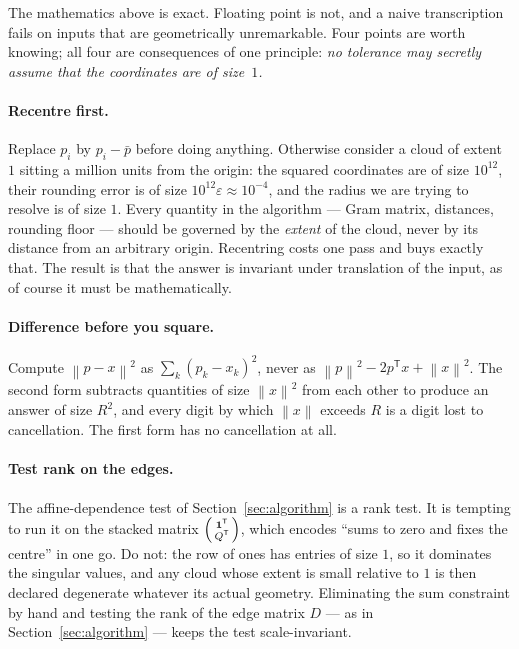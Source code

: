 \documentclass[11pt,a4paper]{article}
\theoremstyle{plain}
\theoremstyle{definition}
\theoremstyle{remark}
\newcommand{\norm}[1]{\left\lVert #1 \right\rVert}
\newcommand{\transpose}{^{\mathsf{T}}}
\begin{document}
The mathematics above is exact. Floating point is not, and a naive transcription
fails on inputs that are geometrically unremarkable. Four points are worth
knowing; all four are consequences of one principle: \emph{no tolerance may
secretly assume that the coordinates are of size~$1$.}

\paragraph{Recentre first.} Replace $p_i$ by $p_i-\bar p$ before doing anything.
Otherwise consider a cloud of extent $1$ sitting a million units from the origin:
the squared coordinates are of size $10^{12}$, their rounding error is of size
$10^{12}\varepsilon \approx 10^{-4}$, and the radius we are trying to resolve is of
size $1$. Every quantity in the algorithm --- Gram matrix, distances, rounding
floor --- should be governed by the \emph{extent} of the cloud, never by its
distance from an arbitrary origin. Recentring costs one pass and buys exactly
that. The result is that the answer is invariant under translation of the input,
as of course it must be mathematically.

\paragraph{Difference before you square.} Compute $\norm{p-x}^2$ as
$\sum_k (p_k-x_k)^2$, never as $\norm{p}^2 - 2p\transpose x + \norm{x}^2$. The
second form subtracts quantities of size $\norm{x}^2$ from each other to produce
an answer of size $R^2$, and every digit by which $\norm{x}$ exceeds $R$ is a
digit lost to cancellation. The first form has no cancellation at all.

\paragraph{Test rank on the edges.} The affine-dependence test of
Section~\ref{sec:algorithm} is a rank test. It is tempting to run it on the
stacked matrix $\begin{psmallmatrix}\mathbf{1}\transpose\\ Q\transpose\end{psmallmatrix}$,
which encodes ``sums to zero and fixes the centre'' in one go. Do not: the row of
ones has entries of size $1$, so it dominates the singular values, and any cloud
whose extent is small relative to $1$ is then declared degenerate whatever its
actual geometry. Eliminating the sum constraint by hand and testing the rank of the
edge matrix $D$ --- as in Section~\ref{sec:algorithm} --- keeps the test
scale-invariant.
\end{document}
